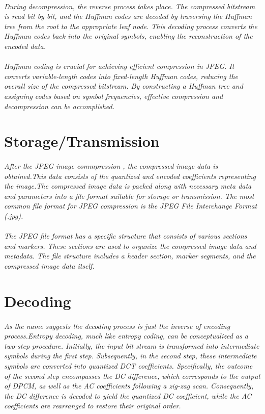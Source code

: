 \documentclass[12pt, letterpaper]{article}
\begin{document}
\paragraph{}\textit{During decompression, the reverse process takes place. The compressed bitstream is read bit by bit, and the Huffman codes are decoded by traversing the Huffman tree from the root to the appropriate leaf node. This decoding process converts the Huffman codes back into the original symbols, enabling the reconstruction of the encoded data. }
\paragraph{}\textit{Huffman coding is crucial for achieving efficient compression in JPEG. It converts variable-length codes into fixed-length Huffman codes, reducing the overall size of the compressed bitstream. By constructing a Huffman tree and assigning codes based on symbol frequencies, effective compression and decompression can be accomplished.}
\section{{\color{blue}Storage/Transmission}}
\paragraph{}\textit{After the JPEG image commpression , the compressed image data is obtained.This data consists of the quantized and encoded coefficients representing the image.The compressed image data is packed along with necessary meta data and parameters into a file format suitable for storage or transmission. The most common file format for JPEG compression is the JPEG File Interchange Format (.jpg).}
\paragraph{}\textit{The JPEG file format has a specific structure that consists of various sections and markers. These sections are used to organize the compressed image data and metadata. The file structure includes a header section, marker segments, and the compressed image data itself.}
\newpage
\section{{\color{blue}Decoding}}
\paragraph{}\textit{As the name suggests the decoding process is just the inverse of encoding process.Entropy decoding, much like entropy coding, can be conceptualized as a two-step procedure. Initially, the input bit stream is transformed into intermediate symbols during the first step. Subsequently, in the second step, these intermediate symbols are converted into quantized DCT coefficients. Specifically, the outcome of the second step encompasses the DC difference, which corresponds to the output of DPCM, as well as the AC coefficients following a zig-zag scan. Consequently, the DC difference is decoded to yield the quantized DC coefficient, while the AC coefficients are rearranged to restore their original order.}
\end{document}
